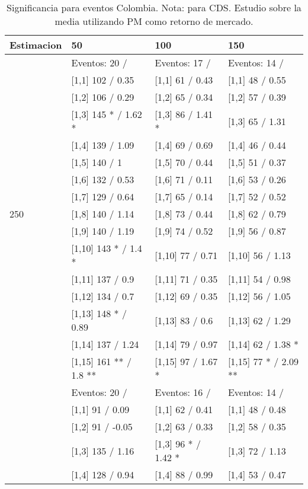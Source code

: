 \begin{table}

\caption{Significancia para eventos Colombia. Nota: para CDS. Estudio sobre la media utilizando PM como retorno de mercado.}
\centering
\begin{tabular}[t]{llll}
\toprule
Estimacion & 50 & 100 & 150\\
\midrule
 & Eventos:  20 / & Eventos:  17 / & Eventos:  14 /\\
 & {}[1,1] 102  / 0.35 & {}[1,1] 61  / 0.43 & {}[1,1] 48  / 0.55\\
 & {}[1,2] 106  / 0.29 & {}[1,2] 65  / 0.34 & {}[1,2] 57  / 0.39\\
 & {}[1,3] 145 * / 1.62 * & {}[1,3] 86  / 1.41 * & {}[1,3] 65  / 1.31\\
 & {}[1,4] 139  / 1.09 & {}[1,4] 69  / 0.69 & {}[1,4] 46  / 0.44\\
\addlinespace
 & {}[1,5] 140  / 1 & {}[1,5] 70  / 0.44 & {}[1,5] 51  / 0.37\\
 & {}[1,6] 132  / 0.53 & {}[1,6] 71  / 0.11 & {}[1,6] 53  / 0.26\\
 & {}[1,7] 129  / 0.64 & {}[1,7] 65  / 0.14 & {}[1,7] 52  / 0.52\\
250 & {}[1,8] 140  / 1.14 & {}[1,8] 73  / 0.44 & {}[1,8] 62  / 0.79\\
 & {}[1,9] 140  / 1.19 & {}[1,9] 74  / 0.52 & {}[1,9] 56  / 0.87\\
\addlinespace
 & {}[1,10] 143 * / 1.4 * & {}[1,10] 77  / 0.71 & {}[1,10] 56  / 1.13\\
 & {}[1,11] 137  / 0.9 & {}[1,11] 71  / 0.35 & {}[1,11] 54  / 0.98\\
 & {}[1,12] 134  / 0.7 & {}[1,12] 69  / 0.35 & {}[1,12] 56  / 1.05\\
 & {}[1,13] 148 * / 0.89 & {}[1,13] 83  / 0.6 & {}[1,13] 62  / 1.29\\
 & {}[1,14] 137  / 1.24 & {}[1,14] 79  / 0.97 & {}[1,14] 62  / 1.38 *\\
\addlinespace
 & {}[1,15] 161 ** / 1.8 ** & {}[1,15] 97  / 1.67 * & {}[1,15] 77 * / 2.09 **\\
 & Eventos:  20 / & Eventos:  16 / & Eventos:  14 /\\
 & {}[1,1] 91  / 0.09 & {}[1,1] 62  / 0.41 & {}[1,1] 48  / 0.48\\
 & {}[1,2] 91  / -0.05 & {}[1,2] 63  / 0.33 & {}[1,2] 58  / 0.35\\
 & {}[1,3] 135  / 1.16 & {}[1,3] 96 * / 1.42 * & {}[1,3] 72  / 1.13\\
\addlinespace
 & {}[1,4] 128  / 0.94 & {}[1,4] 88  / 0.99 & {}[1,4] 53  / 0.47\\

\end{tabular}
\end{table}
